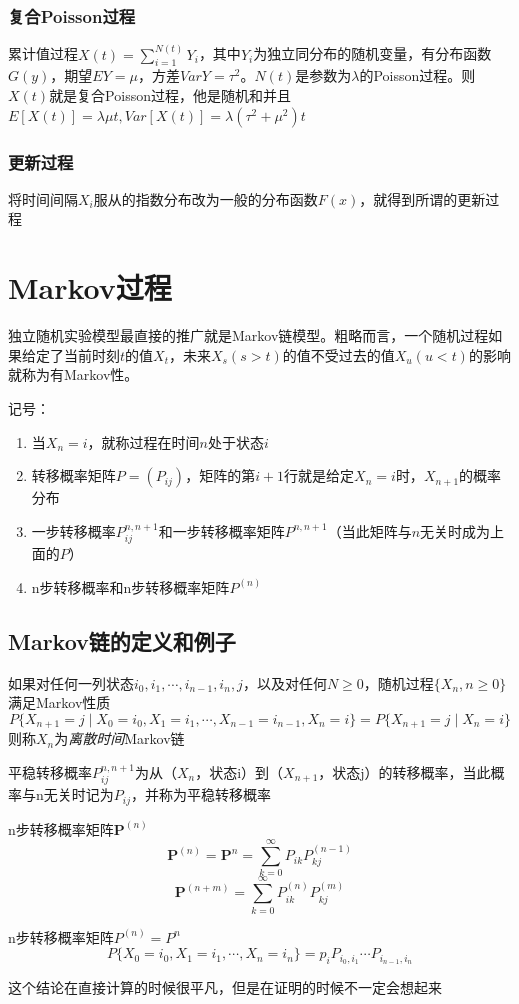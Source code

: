 \documentclass[]{report}
\begin{document}
		\subsection{复合Poisson过程}
			累计值过程$X(t)=\displaystyle\sum_{i=1}^{N(t)}Y_i$，其中$Y_i$为独立同分布的随机变量，有分布函数$G(y)$，期望$EY=\mu$，方差$VarY=\tau^2$。$N(t)$是参数为$\lambda$的Poisson过程。则$X(t)$就是复合Poisson过程，他是随机和并且$E[X(t)]=\lambda\mu t,Var[X(t)]=\lambda(\tau^2+\mu^2)t$
		\subsection{更新过程}
			将时间间隔$X_i$服从的指数分布改为一般的分布函数$F(x)$，就得到所谓的更新过程

	\chapter{Markov过程}
	独立随机实验模型最直接的推广就是Markov链模型。粗略而言，一个随机过程如果给定了当前时刻$t$的值$X_t$，未来$X_s(s>t)$的值不受过去的值$X_u(u<t)$的影响就称为有Markov性。\par
	记号：
	\begin{enumerate}
		\item 当$X_n=i$，就称过程在时间$n$处于状态$i$
		\item 转移概率矩阵$P=(P_{ij})$，矩阵的第$i+1$行就是给定$X_n=i$时，$X_{n+1}$的概率分布
		\item 一步转移概率$P_{ij}^{n,n+1}$和一步转移概率矩阵$P^{n,n+1}$（当此矩阵与$n$无关时成为上面的$P$）
		\item n步转移概率和n步转移概率矩阵$P^{(n)}$
	\end{enumerate}
	\section{Markov链的定义和例子}
		\begin{definition}[Markov性质]
			如果对任何一列状态$i_0,i_1,\cdots,i_{n-1},i_n,j$，以及对任何$N\ge0$，随机过程$\{X_n,n\ge0\}$满足Markov性质
			\[P\{X_{n+1}=j\mid X_0=i_0,X_1=i_1,\cdots,X_{n-1}=i_{n-1},X_n=i\}=P\{X_{n+1}=j\mid X_n=i\}\]
			则称$X_n$为\textit{离散时间}Markov链
		\end{definition}
		\begin{definition}[平稳转移概率]
			平稳转移概率$P_{ij}^{n,n+1}$为从（$X_n$，状态i）到（$X_{n+1}$，状态j）的转移概率，当此概率与n无关时记为$P_{ij}$，并称为平稳转移概率
		\end{definition}
		\begin{definition}[n步转移概率矩阵]
			n步转移概率矩阵$\mathbf{P}^{(n)}$
			\[\mathbf{P}^{(n)}=\mathbf{P}^n=\sum_{k=0}^\infty P_{ik}P_{kj}^{(n-1)}\]
			\[\mathbf{P}^{(n+m)}=\sum_{k=0}^\infty P_{ik}^{(n)}P_{kj}^{(m)}\]
		\end{definition}
		\begin{theorem}[求n步转移概率矩阵]
			n步转移概率矩阵$P^{(n)}=P^n$
			\[P\{X_0=i_0,X_1=i_1,\cdots,X_n=i_n\}=p_iP_{i_0,i_1}\cdots P_{i_{n-1},i_n}\]\par
			这个结论在直接计算的时候很平凡，但是在证明的时候不一定会想起来
		\end{theorem}
\end{document}
